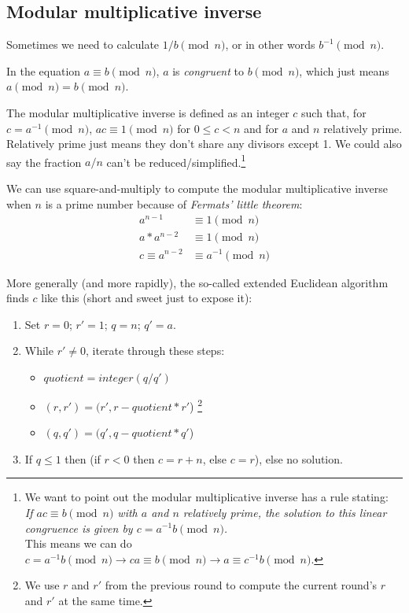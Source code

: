 \subsection{Modular multiplicative inverse}

Sometimes we need to calculate $1/b \pmod n$, or in other words $b^{-1} \pmod n$.

In the equation $a \equiv b \pmod{n}$, $a$ is {\em congruent} to $b \pmod{n}$, which just means \(a \pmod{n} = b \pmod{n}\).

The modular multiplicative inverse is defined as an integer $c$ such that, for $c = a^{-1} \pmod{n}$, $a c \equiv 1 \pmod{n}$ for $0 \leq c < n$ and for $a$ and $n$ relatively prime. Relatively prime just means they don't share any divisors except 1. We could also say the fraction $a/n$ can't be reduced/simplified.\footnote{\label{inverse_rule_note}We want to point out the modular multiplicative inverse has a rule stating:\\
{\em If $a c \equiv b \pmod{n}$ with $a$ and $n$ relatively prime, the solution to this linear congruence is given by \(c = a^{-1} b \pmod{n}\).}\cite{wiki-modular-arithmetic}\\
This means we can do $c = a^{-1} b \pmod n \rightarrow ca \equiv b \pmod n \rightarrow a \equiv c^{-1} b \pmod n$.}

We can use square-and-multiply to compute the modular multiplicative inverse when $n$ is a prime number because of {\em Fermats’ little theorem}: 
\begin{align*} 
a^{n-1} &\equiv 1 \pmod{n} \\
a*a^{n-2} &\equiv 1 \pmod{n} \\
c \equiv a^{n-2} &\equiv a^{-1} \pmod{n}
\end{align*}

More generally (and more rapidly), the so-called extended Euclidean algorithm finds $c$ like this (short and sweet just to expose it):

\begin{enumerate}
    \item Set $r = 0$; $r' =1$; $q = n$; $q' =a$.
    \item While $r' \ne 0$, iterate through these steps:
    \begin{itemize}
        \item $quotient = integer(q/q')$
        \item $(r, r') = (r', r - quotient*r'$) \footnote{We use $r$ and $r'$ from the previous round to compute the current round's $r$ and $r'$ at the same time.}
        \item $(q, q') = (q', q - quotient*q'$)
    \end{itemize}
    \item If $q \leq 1$ then (if $r < 0$ then {\em $c = r + n$}, else {\em $c = r$}), else no solution.
\end{enumerate}


